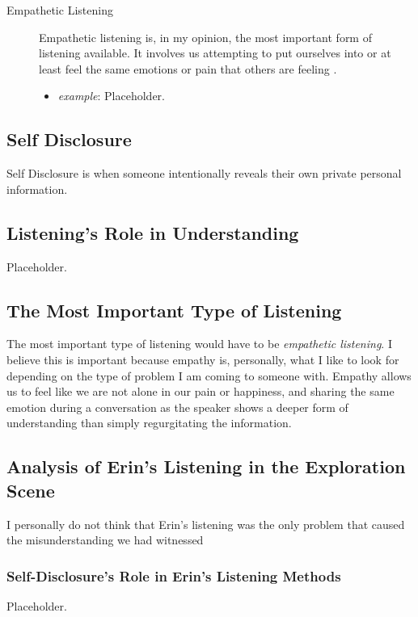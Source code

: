 \documentclass[stu,12pt]{apa7}
\begin{document}
\begin{description}
\begin{itemize}
          \end{itemize}
        \item[Empathetic Listening]
          Empathetic listening is, in my opinion, the most important form of
            listening available. It involves us attempting to put ourselves into
            or at least feel the same emotions or pain that others are feeling
            \parencite[pp. 335--336]{noauthor_communication_2013}.
          \begin{itemize}
            \item \textit{example}: Placeholder.
          \end{itemize}
      \end{description}

    \subsection{Self Disclosure}
      Self Disclosure is when someone intentionally reveals their own private
        personal information.

    \subsection{Listening's Role in Understanding}
      Placeholder.

    \subsection{The Most Important Type of Listening}
      The most important type of listening would have to be
        \textit{empathetic listening}. I believe this is important because
        empathy is, personally, what I like to look for depending on the type
        of problem I am coming to someone with. Empathy allows us to feel like
        we are not alone in our pain or happiness, and sharing the same emotion
        during a conversation as the speaker shows a deeper form of
        understanding than simply regurgitating the information.

    \subsection{Analysis of Erin's Listening in the Exploration Scene}
      I personally do not think that Erin's listening was the only problem
        that caused the misunderstanding we had witnessed

      \subsubsection{Self-Disclosure's Role in Erin's Listening Methods}
      Placeholder.
\end{document}
